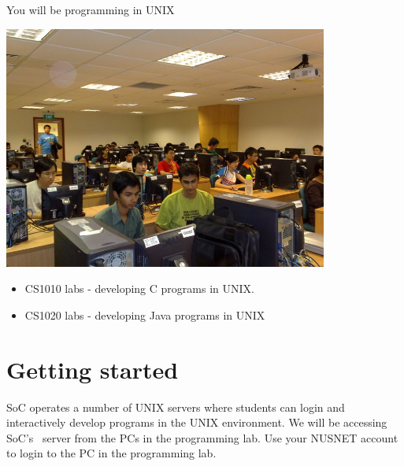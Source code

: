 \begin{frame}{You will be programming in UNIX}

\begin{center}
\includegraphics[width=0.8\textwidth]{programming}
\end{center}

\begin{itemize}
\item CS1010 labs - developing C programs in UNIX.  
\item CS1020 labs - developing Java programs in UNIX
\end{itemize}
\end{frame}

\section{Getting started} %
SoC operates a number of UNIX servers where students can login and interactively
develop programs in the UNIX environment.  We will be accessing SoC's \sunfire\
server from the PCs in the programming lab.  Use your NUSNET account to login to
the PC in the programming lab.  

